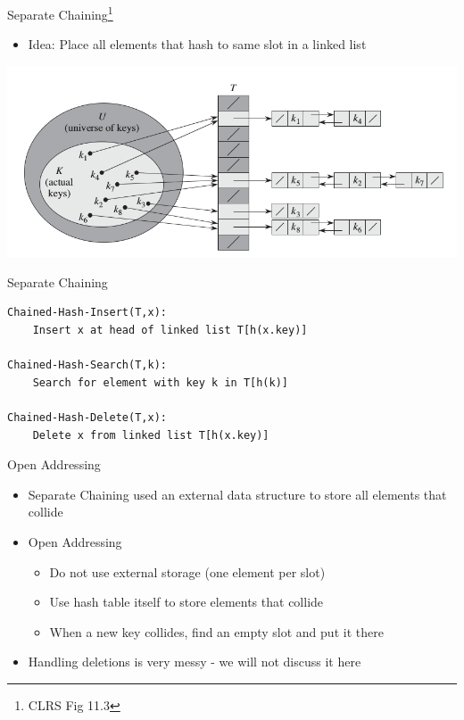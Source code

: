 \documentclass{beamer}
\begin{document}
\begin{frame}{Separate Chaining\footnote{CLRS Fig 11.3}}
    \begin{itemize}
        \item Idea: Place all elements that hash to same slot in a linked list 
    \end{itemize}
    \begin{center}
        \includegraphics[scale=0.36]{hashTablesChaining.png}
    \end{center}
\end{frame}

\begin{frame}[fragile]{Separate Chaining}
    \begin{verbatim}
Chained-Hash-Insert(T,x):
    Insert x at head of linked list T[h(x.key)]

Chained-Hash-Search(T,k):
    Search for element with key k in T[h(k)]

Chained-Hash-Delete(T,x):
    Delete x from linked list T[h(x.key)] 
    \end{verbatim}
\end{frame}

\begin{frame}{Open Addressing}
    \begin{itemize}
        \item Separate Chaining used an external data structure to store all elements that collide
        \item Open Addressing 
        \begin{itemize}
            \item Do not use external storage (one element per slot)
            \item Use hash table itself to store elements that collide
            \item When a new key collides, find an empty slot and put it there
        \end{itemize}
        \item Handling deletions is very messy - we will not discuss it here
    \end{itemize}
\end{frame}
\end{document}
